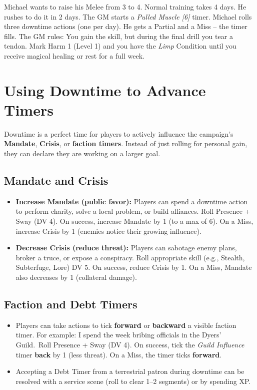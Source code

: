 \begin{tcolorbox}[colback=red!5!white, colframe=red!75!black, title=Example: Rushing a Skill,breakable]
Michael wants to raise his Melee from 3 to 4. Normal training takes 4 days. He rushes to do it in 2 days. The GM starts a \textit{Pulled Muscle [6]} timer. Michael rolls three downtime actions (one per day). He gets a Partial and a Miss -- the timer fills. The GM rules: \textquotedbl You gain the skill, but during the final drill you tear a tendon. Mark Harm 1 (Level 1) and you have the \textit{Limp} Condition until you receive magical healing or rest for a full week.\textquotedbl
\end{tcolorbox}

\section{Using Downtime to Advance Timers}
\label{sec:downtime-advance-timers}

Downtime is a perfect time for players to actively influence the campaign's \textbf{Mandate}, \textbf{Crisis}, or \textbf{faction timers}. Instead of just rolling for personal gain, they can declare they are working on a larger goal.

\subsection{Mandate and Crisis}
\label{subsec:mandate-crisis}
\begin{itemize}
\item \textbf{Increase Mandate (public favor):} Players can spend a downtime action to perform charity, solve a local problem, or build alliances. Roll Presence + Sway (DV 4). On success, increase Mandate by 1 (to a max of 6). On a Miss, increase Crisis by 1 (enemies notice their growing influence).
\item \textbf{Decrease Crisis (reduce threat):} Players can sabotage enemy plans, broker a truce, or expose a conspiracy. Roll appropriate skill (e.g., Stealth, Subterfuge, Lore) DV 5. On success, reduce Crisis by 1. On a Miss, Mandate also decreases by 1 (collateral damage).
\end{itemize}

\subsection{Faction and Debt Timers}
\label{subsec:faction-debt-timers}
\begin{itemize}
\item Players can take actions to tick \textbf{forward} or \textbf{backward} a visible faction timer. For example: \textquotedbl I spend the week bribing officials in the Dyers' Guild.\textquotedbl\ Roll Presence + Sway (DV 4). On success, tick the \textit{Guild Influence} timer \textbf{back} by 1 (less threat). On a Miss, the timer ticks \textbf{forward}.
\item Accepting a Debt Timer from a terrestrial patron during downtime can be resolved with a service scene (roll to clear 1--2 segments) or by spending XP.
\end{itemize}

